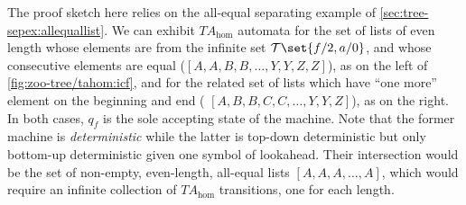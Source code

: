 The proof sketch here relies on the all-equal separating example of
\autoref{sec:tree-sepex:allequallist}.  We can exhibit $TA_{\text{hom}}$
automata for the set of lists of even length whose elements are from the
infinite set $\mathcal{T}\set{f/2, a/0}$, and whose consecutive elements are
equal (\eg $[A,A,B,B,\ldots,Y,Y,Z,Z]$), as on the left of
\autoref{fig:zoo-tree/tahom:icf}, and for the related set of lists which
have ``one more'' element on the beginning and end (\eg
$[A,B,B,C,C,\ldots,Y,Y,Z]$), as on the right.  In both cases, $q_f$ is the
sole accepting state of the machine.  Note that the former machine is {\em
deterministic} while the latter is top-down deterministic but only bottom-up
deterministic given one symbol of lookahead.  Their intersection would be
the set of non-empty, even-length, all-equal lists $[A,A,A,\ldots,A]$, which
would require an infinite collection of $TA_{\text{hom}}$ transitions, one
for each length.

